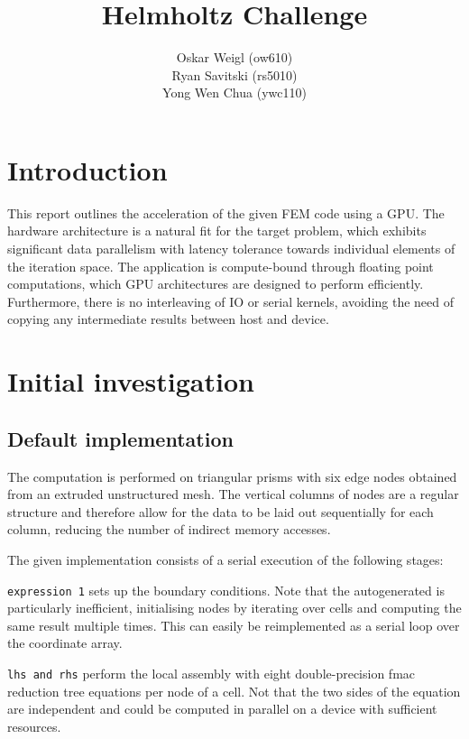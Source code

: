 \documentclass[11pt, oneside, a4paper]{article}
\date{}
\title{Helmholtz Challenge}
\author{
  \small{Oskar Weigl (ow610)}\\
  \small{Ryan Savitski (rs5010)}\\
  \small{Yong Wen Chua (ywc110)}
}
\begin{document}
\maketitle

\section{Introduction} %
\label{sec:introduction}

This report outlines the acceleration of the given FEM code using a GPU. The hardware architecture is a natural fit for the target problem, which exhibits significant data parallelism with latency tolerance towards individual elements of the iteration space. The application is compute-bound through floating point computations, which GPU architectures are designed to perform efficiently. Furthermore, there is no interleaving of IO or serial kernels, avoiding the need of copying any intermediate results between host and device.


\section{Initial investigation} %
\label{sec:initial_investigation}




\subsection{Default implementation} %
\label{sub:default_implementation}

The computation is performed on triangular prisms with six edge nodes obtained from an extruded unstructured mesh. The vertical columns of nodes are a regular structure and therefore allow for the data to be laid out sequentially for each column, reducing the number of indirect memory accesses.

The given implementation consists of a serial execution of the following stages: 

 \texttt{expression 1} sets up the boundary conditions. Note that the autogenerated is particularly inefficient, initialising nodes by iterating over cells and computing the same result multiple times. This can easily be reimplemented as a serial loop over the coordinate array.

\texttt{lhs and rhs} perform the local assembly with eight double-precision fmac reduction tree equations per node of a cell. Not that the two sides of the equation are independent and could be computed in parallel on a device with sufficient resources.
\end{document}
